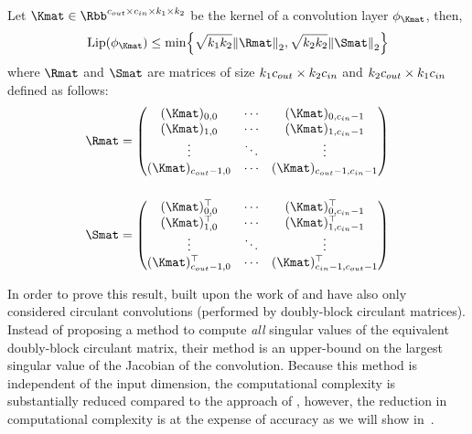 \begin{theorem}
  Let $\Kmat \in \Rbb^{\cout \times \cin \times k_1 \times k_2}$ be the kernel of a convolution layer $\layer_\Kmat$, then,
  \begin{equation}
    \lip{\layer_\Kmat} \leq \min \left\{ \sqrt{k_1 k_2} \norm{\Rmat}_2, \sqrt{k_2 k_2} \norm{\Smat}_2 \right\}
  \end{equation}
  where $\Rmat$ and $\Smat$ are matrices of size $k_1 c_{out} \times k_2 c_{in}$ and $k_2 c_{out} \times k_1 c_{in}$ defined as follows:
  \begin{align}
    \Rmat &= \leftmatrix
      (\Kmat)_{0,0}       & \cdots & (\Kmat)_{0,\cin-1} \\
      (\Kmat)_{1,0}       & \cdots & (\Kmat)_{1,\cin-1} \\
      \vdots              & \ddots & \vdots             \\
      (\Kmat)_{\cout-1,0} & \cdots & (\Kmat)_{\cout-1,\cin-1}
    \rightmatrix \\[0.5cm]
    \Smat &= \leftmatrix
      (\Kmat)_{0,0}^\top       & \cdots & (\Kmat)_{0,\cin-1}^\top \\
      (\Kmat)_{1,0}^\top       & \cdots & (\Kmat)_{1,\cin-1}^\top \\
      \vdots                   & \ddots & \vdots                  \\
      (\Kmat)_{\cout-1,0}^\top & \cdots & (\Kmat)_{\cin-1,\cout-1}^\top
    \rightmatrix
  \end{align}
  \removespace
\end{theorem}

In order to prove this result, \citet{singla2019bounding} built upon the work of \citet{sedghi2018singular} and have also only considered circulant convolutions (performed by doubly-block circulant matrices).
Instead of proposing a method to compute \emph{all} singular values of the equivalent doubly-block circulant matrix, their method is an upper-bound on the largest singular value of the Jacobian of the convolution. 
Because this method is independent of the input dimension, the computational complexity is substantially reduced compared to the approach of \citet{sedghi2018singular}, however, the reduction in computational complexity is at the expense of accuracy as we will show in~.
 

